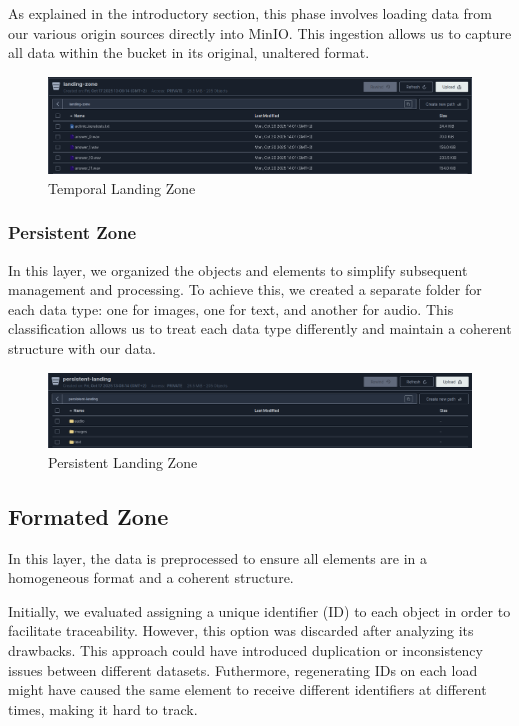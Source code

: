 \documentclass[12pt]{article}
\begin{document}
As explained in the introductory section, this phase involves loading data from our various origin sources directly into MinIO. This ingestion allows us to capture all data within the bucket in its original, unaltered format.

\begin{figure}[H]
    \centering
    \includegraphics[width=1\linewidth]{temporal.png}
    \caption{Temporal Landing Zone}
    \label{fig:temporal}
\end{figure}

\subsubsection{Persistent Zone}

In this layer, we organized the objects and elements to simplify subsequent management and processing. To achieve this, we created a separate folder for each data type: one for images, one for text, and another for audio. This classification allows us to treat each data type differently and maintain a coherent structure with our data.


\begin{figure}[H]
    \centering
    \includegraphics[width=1\linewidth]{persistent.png}
    \caption{Persistent Landing Zone}
    \label{fig:persistent}
\end{figure}

\subsection{Formated Zone}

In this layer, the data is preprocessed to ensure all elements are in a homogeneous format and a coherent structure.

Initially, we evaluated assigning a unique identifier (ID) to each object in order to facilitate traceability. However, this option was discarded after analyzing its drawbacks. This approach could have introduced duplication or inconsistency issues between different datasets. Futhermore, regenerating IDs on each load might have caused the same element to receive different identifiers at different times, making it hard to track.
\end{document}
